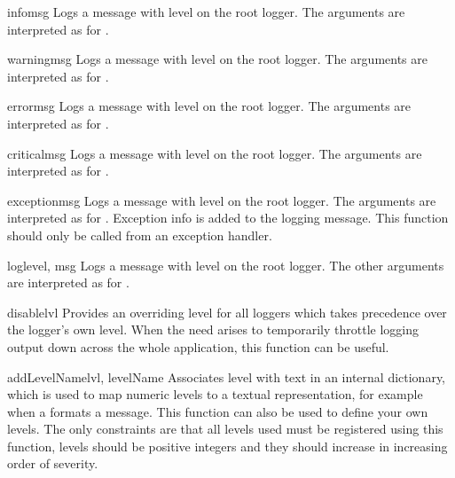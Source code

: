 \begin{funcdesc}{info}{msg}
Logs a message with level  on the root logger.
The arguments are interpreted as for .
\end{funcdesc}

\begin{funcdesc}{warning}{msg}
Logs a message with level  on the root logger.
The arguments are interpreted as for .
\end{funcdesc}

\begin{funcdesc}{error}{msg}
Logs a message with level  on the root logger.
The arguments are interpreted as for .
\end{funcdesc}

\begin{funcdesc}{critical}{msg}
Logs a message with level  on the root logger.
The arguments are interpreted as for .
\end{funcdesc}

\begin{funcdesc}{exception}{msg}
Logs a message with level  on the root logger.
The arguments are interpreted as for . Exception info
is added to the logging message. This function should only be called
from an exception handler.
\end{funcdesc}

\begin{funcdesc}{log}{level, msg}
Logs a message with level  on the root logger.
The other arguments are interpreted as for .
\end{funcdesc}

\begin{funcdesc}{disable}{lvl}
Provides an overriding level  for all loggers which takes
precedence over the logger's own level. When the need arises to
temporarily throttle logging output down across the whole application,
this function can be useful.
\end{funcdesc}

\begin{funcdesc}{addLevelName}{lvl, levelName}
Associates level  with text  in an internal
dictionary, which is used to map numeric levels to a textual
representation, for example when a  formats a message.
This function can also be used to define your own levels. The only
constraints are that all levels used must be registered using this
function, levels should be positive integers and they should increase
in increasing order of severity.
\end{funcdesc}


